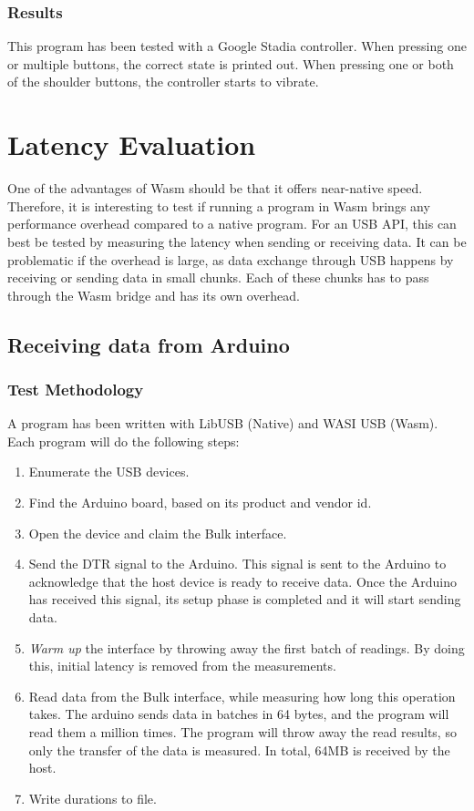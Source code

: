 \subsubsection{Results}
This program has been tested with a Google Stadia controller. When pressing one or multiple buttons, the correct state is printed out. When pressing one or both of the shoulder buttons, the controller starts to vibrate.



\section{Latency Evaluation}

One of the advantages of \acrshort{Wasm} should be that it offers near-native speed. Therefore, it is interesting to test if running a program in Wasm brings any performance overhead compared to a native program. For an USB API, this can best be tested by measuring the latency when sending or receiving data. It can be problematic if the overhead is large, as data exchange through USB happens by receiving or sending data in small chunks. Each of these chunks has to pass through the Wasm bridge and has its own overhead.

\subsection{Receiving data from Arduino}

\subsubsection{Test Methodology}
A program has been written with LibUSB (Native) and WASI USB (Wasm). Each program will do the following steps:

\begin{enumerate}
\item Enumerate the USB devices.
\item Find the Arduino board, based on its product and vendor id.
\item Open the device and claim the Bulk interface.
\item Send the \acrfull{DTR} signal to the Arduino. This signal is sent to the Arduino to acknowledge that the host device is ready to receive data. Once the Arduino has received this signal, its setup phase is completed and it will start sending data.
\item \textit{Warm up } the interface by throwing away the first batch of readings. By doing this, initial latency is removed from the measurements.
\item Read data from the Bulk interface, while measuring how long this operation takes. The arduino sends data in batches in 64 bytes, and the program will read them a million times. The program will throw away the read results, so only the transfer of the data is measured. In total, 64MB is received by the host.
\item Write durations to file.
\end{enumerate}

